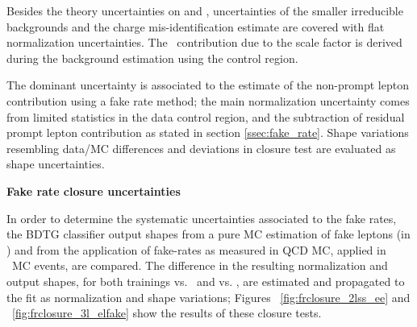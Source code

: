 Besides the theory uncertainties on \ttW and \ttZ, uncertainties of the smaller irreducible backgrounds and the charge mis-identification estimate are covered with flat normalization uncertainties. The \WZ\ contribution due to the scale factor is derived during the background estimation using the control region.

The dominant uncertainty is associated to the estimate of the non-prompt lepton contribution using a fake rate method; the main normalization uncertainty comes from limited statistics in the data control region, and the subtraction of residual prompt lepton contribution as stated in section \ref{ssec:fake_rate}. Shape variations resembling data/MC differences and deviations in closure test are evaluated as shape uncertainties.

\textbf{Fake rate closure uncertainties}

In order to determine the systematic uncertainties associated to the fake rates, the BDTG classifier output shapes from a pure MC estimation of fake leptons (in \ttbar) and from the application of fake-rates as measured in QCD MC, applied in \ttbar\ MC events, are compared. The difference in the resulting normalization and output shapes, for both trainings vs. \ttbar\ and vs. \ttV, are estimated and propagated to the fit as normalization and shape variations; Figures ~\ref{fig:frclosure_2lss_ee} and ~\ref{fig:frclosure_3l_elfake} show the results of these closure tests.

